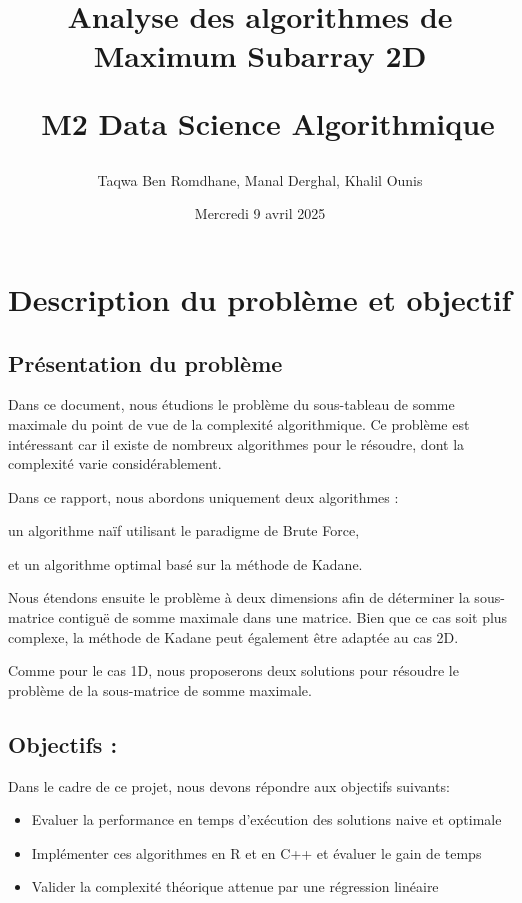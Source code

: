 \documentclass[
]{article}
\title{Analyse des algorithmes de Maximum Subarray 2D\\
\strut ~M2 Data Science Algorithmique}
\author{Taqwa Ben Romdhane, Manal Derghal, Khalil Ounis}
\date{Mercredi 9 avril 2025}
\begin{document}
\maketitle

{
\hypersetup{linkcolor=}
\setcounter{tocdepth}{2}
\tableofcontents
}
\noindent\hrulefill

\section{Description du problème et
objectif}\label{description-du-probluxe8me-et-objectif}

\subsection{Présentation du
problème}\label{pruxe9sentation-du-probluxe8me}

Dans ce document, nous étudions le problème du sous-tableau de somme
maximale du point de vue de la complexité algorithmique. Ce problème est
intéressant car il existe de nombreux algorithmes pour le résoudre, dont
la complexité varie considérablement.

Dans ce rapport, nous abordons uniquement deux algorithmes :

un algorithme naïf utilisant le paradigme de Brute Force,

et un algorithme optimal basé sur la méthode de Kadane.

Nous étendons ensuite le problème à deux dimensions afin de déterminer
la sous-matrice contiguë de somme maximale dans une matrice. Bien que ce
cas soit plus complexe, la méthode de Kadane peut également être adaptée
au cas 2D.

Comme pour le cas 1D, nous proposerons deux solutions pour résoudre le
problème de la sous-matrice de somme maximale.

\subsection{Objectifs :}\label{objectifs}

Dans le cadre de ce projet, nous devons répondre aux objectifs suivants:

\begin{itemize}
\item
  Evaluer la performance en temps d'exécution des solutions naive et
  optimale
\item
  Implémenter ces algorithmes en R et en C++ et évaluer le gain de temps
\item
  Valider la complexité théorique attenue par une régression linéaire
\end{itemize}
\end{document}
